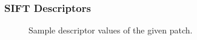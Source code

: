 \documentclass[11pt]{beamer}
\begin{document}
    \begin{frame}
        \frametitle{SIFT Descriptors}
        \begin{center}
   			\begin{figure}[thpb]
      		\centering
      		\setlength\fboxsep{0pt}
	  		\setlength\fboxrule{0.5pt}
      		\caption{\centering Sample descriptor values of the given patch.}
      		\label{figure1}
   			\end{figure}        
        \end{center}
    \end{frame}   
    
    
\end{document}
